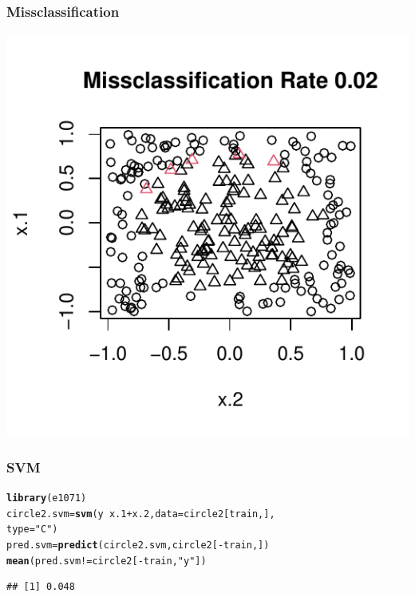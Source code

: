 \documentclass[]{beamer}\usepackage[]{graphicx}\usepackage[]{color}
\makeatletter
\def\maxwidth{ %
  \ifdim\Gin@nat@width>\linewidth
    \linewidth
  \else
    \Gin@nat@width
  \fi
}
\newcommand{\hlstr}[1]{\textcolor[rgb]{0.192,0.494,0.8}{#1}}%
\newcommand{\hlopt}[1]{\textcolor[rgb]{0,0,0}{#1}}%
\newcommand{\hlstd}[1]{\textcolor[rgb]{0.345,0.345,0.345}{#1}}%
\newcommand{\hlkwb}[1]{\textcolor[rgb]{0.69,0.353,0.396}{#1}}%
\newcommand{\hlkwc}[1]{\textcolor[rgb]{0.333,0.667,0.333}{#1}}%
\newcommand{\hlkwd}[1]{\textcolor[rgb]{0.737,0.353,0.396}{\textbf{#1}}}%
\newenvironment{kframe}{%
 \def\at@end@of@kframe{}%
 \ifinner\ifhmode%
  \def\at@end@of@kframe{\end{minipage}}%
  \begin{minipage}{\columnwidth}%
 \fi\fi%
 \def\FrameCommand##1{\hskip\@totalleftmargin \hskip-\fboxsep
 \colorbox{shadecolor}{##1}\hskip-\fboxsep
     \hskip-\linewidth \hskip-\@totalleftmargin \hskip\columnwidth}%
 \MakeFramed {\advance\hsize-\width
   \@totalleftmargin\z@ \linewidth\hsize
   \@setminipage}}%
 {\par\unskip\endMakeFramed%
 \at@end@of@kframe}
\newenvironment{knitrout}{}{} %
\makeatother
\begin{document}
\begin{frame}[fragile] \frametitle{Missclassification}
\begin{knitrout}
\color{fgcolor}
\includegraphics[width=\maxwidth]{figure/unnamed-chunk-2-1} 
\end{knitrout}

\end{frame}

\begin{frame}[fragile] \frametitle{SVM}
\begin{knitrout}
\color{fgcolor}\begin{kframe}
\begin{alltt}
\hlkwd{library}\hlstd{(e1071)}
\hlstd{circle2.svm} \hlkwb{=} \hlkwd{svm}\hlstd{(y} \hlopt{~} \hlstd{x.1} \hlopt{+} \hlstd{x.2,} \hlkwc{data}\hlstd{=circle2[train,],}
                  \hlkwc{type}\hlstd{=}\hlstr{"C"}\hlstd{)}
\hlstd{pred.svm} \hlkwb{=} \hlkwd{predict}\hlstd{(circle2.svm, circle2[}\hlopt{-}\hlstd{train,])}
\hlkwd{mean}\hlstd{(pred.svm} \hlopt{!=} \hlstd{circle2[}\hlopt{-}\hlstd{train,} \hlstr{"y"}\hlstd{])}
\end{alltt}
\begin{verbatim}
## [1] 0.048
\end{verbatim}
\end{kframe}
\end{knitrout}

\end{frame}
\end{document}
